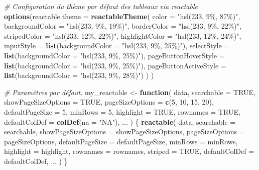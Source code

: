 \documentclass[
  french,
]{book}
\newenvironment{Shaded}{\begin{snugshade}}{\end{snugshade}}
\newcommand{\CommentTok}[1]{\textcolor[rgb]{0.56,0.35,0.01}{\textit{#1}}}
\newcommand{\ControlFlowTok}[1]{\textcolor[rgb]{0.13,0.29,0.53}{\textbf{#1}}}
\newcommand{\DataTypeTok}[1]{\textcolor[rgb]{0.13,0.29,0.53}{#1}}
\newcommand{\DecValTok}[1]{\textcolor[rgb]{0.00,0.00,0.81}{#1}}
\newcommand{\KeywordTok}[1]{\textcolor[rgb]{0.13,0.29,0.53}{\textbf{#1}}}
\newcommand{\NormalTok}[1]{#1}
\newcommand{\OtherTok}[1]{\textcolor[rgb]{0.56,0.35,0.01}{#1}}
\newcommand{\StringTok}[1]{\textcolor[rgb]{0.31,0.60,0.02}{#1}}
\begin{document}
\begin{Shaded}
\begin{Highlighting}[]
\CommentTok{\# Configuration du thème par défaut des tableaux via \textquotesingle{}reactable\textquotesingle{}}
\KeywordTok{options}\NormalTok{(}\DataTypeTok{reactable.theme =} \KeywordTok{reactableTheme}\NormalTok{(}
  \DataTypeTok{color =} \StringTok{"hsl(233, 9\%, 87\%)"}\NormalTok{,}
  \DataTypeTok{backgroundColor =} \StringTok{"hsl(233, 9\%, 19\%)"}\NormalTok{, }
  \DataTypeTok{borderColor =} \StringTok{"hsl(233, 9\%, 22\%)"}\NormalTok{, }
  \DataTypeTok{stripedColor =} \StringTok{"hsl(233, 12\%, 22\%)"}\NormalTok{, }
  \DataTypeTok{highlightColor =} \StringTok{"hsl(233, 12\%, 24\%)"}\NormalTok{,}
  \DataTypeTok{inputStyle =} \KeywordTok{list}\NormalTok{(}\DataTypeTok{backgroundColor =} \StringTok{"hsl(233, 9\%, 25\%)"}\NormalTok{), }
  \DataTypeTok{selectStyle =} \KeywordTok{list}\NormalTok{(}\DataTypeTok{backgroundColor =} \StringTok{"hsl(233, 9\%, 25\%)"}\NormalTok{), }
  \DataTypeTok{pageButtonHoverStyle =} \KeywordTok{list}\NormalTok{(}\DataTypeTok{backgroundColor =} \StringTok{"hsl(233, 9\%, 25\%)"}\NormalTok{), }
  \DataTypeTok{pageButtonActiveStyle =} \KeywordTok{list}\NormalTok{(}\DataTypeTok{backgroundColor =} \StringTok{"hsl(233, 9\%, 28\%)"}\NormalTok{)}
\NormalTok{  )}
\NormalTok{)}

\CommentTok{\# Paramètres par défaut.}
\NormalTok{my\_reactable \textless{}{-}}\StringTok{ }\ControlFlowTok{function}\NormalTok{(}
\NormalTok{  data,}
  \DataTypeTok{searchable =} \OtherTok{TRUE}\NormalTok{,}
  \DataTypeTok{showPageSizeOptions =} \OtherTok{TRUE}\NormalTok{,}
  \DataTypeTok{pageSizeOptions =} \KeywordTok{c}\NormalTok{(}\DecValTok{5}\NormalTok{, }\DecValTok{10}\NormalTok{, }\DecValTok{15}\NormalTok{, }\DecValTok{20}\NormalTok{),}
  \DataTypeTok{defaultPageSize =} \DecValTok{5}\NormalTok{, }
  \DataTypeTok{minRows =} \DecValTok{5}\NormalTok{,}
  \DataTypeTok{highlight =} \OtherTok{TRUE}\NormalTok{,}
  \DataTypeTok{rownames =} \OtherTok{TRUE}\NormalTok{,}
  \DataTypeTok{defaultColDef =} \KeywordTok{colDef}\NormalTok{(}\DataTypeTok{na =} \StringTok{"NA"}\NormalTok{),}
\NormalTok{  ...}
\NormalTok{) \{}
  \KeywordTok{reactable}\NormalTok{(}
\NormalTok{    data,}
    \DataTypeTok{searchable =}\NormalTok{ searchable,}
    \DataTypeTok{showPageSizeOptions =}\NormalTok{ showPageSizeOptions,}
    \DataTypeTok{pageSizeOptions =}\NormalTok{ pageSizeOptions,}
    \DataTypeTok{defaultPageSize =}\NormalTok{ defaultPageSize, }
    \DataTypeTok{minRows =}\NormalTok{ minRows,}
    \DataTypeTok{highlight =}\NormalTok{ highlight,}
    \DataTypeTok{rownames =}\NormalTok{ rownames,}
    \DataTypeTok{striped =} \OtherTok{TRUE}\NormalTok{,}
    \DataTypeTok{defaultColDef =}\NormalTok{ defaultColDef,}
\NormalTok{    ...}
\NormalTok{  )}
\NormalTok{\}}
\end{Highlighting}
\end{Shaded}
\end{document}
